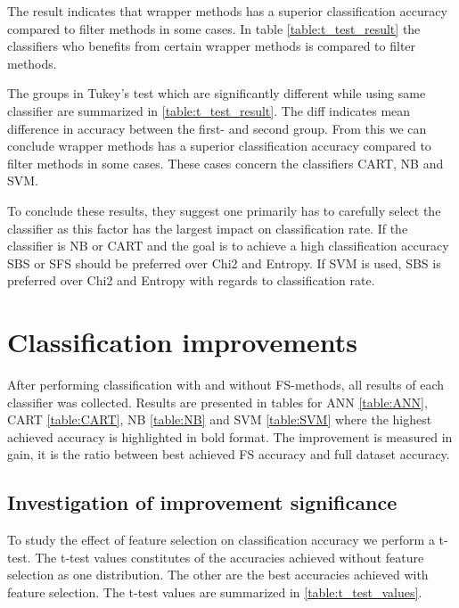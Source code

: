 The result indicates that wrapper methods has a superior classification accuracy compared to filter methods in some cases. In table \ref{table:t_test_result} the classifiers who benefits from certain wrapper methods is compared to filter methods.

The groups in Tukey's test which are significantly different while using same classifier are summarized in \ref{table:t_test_result}. The diff indicates mean difference in accuracy between the first- and second group. From this we can conclude wrapper methods has a superior classification accuracy compared to filter methods in some cases. These cases concern the classifiers CART, NB and SVM.



To conclude these results, they suggest one primarily has to carefully select the classifier as this factor has the largest impact on classification rate. If the classifier is NB or CART and the goal is to achieve a high classification accuracy SBS or SFS should be preferred over Chi2 and Entropy. If SVM is used, SBS is preferred over Chi2 and Entropy with regards to classification rate.


\section{Classification improvements}

After performing classification with and without FS-methods, all results of each classifier was collected. Results are presented in tables for ANN \ref{table:ANN}, CART \ref{table:CART}, NB \ref{table:NB} and SVM \ref{table:SVM} where the highest achieved accuracy is highlighted in bold format. The improvement is measured in gain, it is the ratio between best achieved FS accuracy and full dataset accuracy.



\subsection{Investigation of improvement significance}

To study the effect of feature selection on classification accuracy we perform a t-test. The t-test values constitutes of the accuracies achieved without feature selection as one distribution. The other are the best accuracies achieved with feature selection. The t-test values are summarized in \ref{table:t_test_values}.

